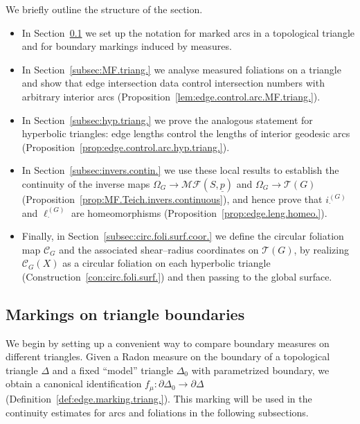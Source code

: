 \documentclass[11pt, letterpaper]{amsart}
\theoremstyle{definition}
\theoremstyle{remark}
\newcommand{\up}{\underline{p}}
\newcommand{\lG}{\ell^{(G)}}
\newcommand{\iG}{i^{(G)}}
\newcommand{\cMFp}{\mathcal{MF} (S,\up)}
\newcommand{\cC}{\mathcal{C}}
\newcommand{\cT}{\mathcal{T}}
\numberwithin{equation}{section}
\begin{document}
We briefly outline the structure of the section.
\begin{itemize}
  \item In Section~\ref{subsec:arc.triang.} we set up the notation for
  marked arcs in a topological triangle and for boundary markings induced
  by measures.
  \item In Section~\ref{subsec:MF.triang.} we analyse measured foliations on
  a triangle and show that edge intersection data control intersection
  numbers with arbitrary interior arcs
  (Proposition~\ref{lem:edge.control.arc.MF.triang.}).
  \item In Section~\ref{subsec:hyp.triang.} we prove the analogous statement
  for hyperbolic triangles: edge lengths control the lengths of interior
  geodesic arcs (Proposition~\ref{prop:edge.control.arc.hyp.triang.}).
  \item In Section~\ref{subsec:invers.contin.} we use these local results to
  establish the continuity of the inverse maps
  $\Omega_G\to\cMFp$ and $\Omega_G\to\cT(G)$
  (Proposition~\ref{prop:MF.Teich.invers.continuous}), and hence prove that
  $\iG_{\cdot}$ and $\lG_{\cdot}$ are homeomorphisms
  (Proposition~\ref{prop:edge.leng.homeo.}).
  \item Finally, in Section~\ref{subsec:circ.foli.surf.coor.} we define the
  circular foliation map $\cC_G$ and the associated shear--radius
  coordinates on $\cT(G)$, by realizing $\cC_G(X)$ as a circular foliation
  on each hyperbolic triangle (Construction~\ref{con:circ.foli.surf.}) and
  then passing to the global surface.
\end{itemize}


\subsection{Markings on triangle boundaries}
\label{subsec:arc.triang.}

We begin by setting up a convenient way to compare boundary measures on different
triangles.  Given a Radon measure on the boundary of a topological triangle
$\Delta$ and a fixed ``model'' triangle $\Delta_0$ with parametrized boundary,
we obtain a canonical identification $f_\mu:\partial\Delta_0\to\partial\Delta$
(Definition~\ref{def:edge.marking.triang.}).  This marking will be used in the
continuity estimates for arcs and foliations in the following subsections.
\end{document}
